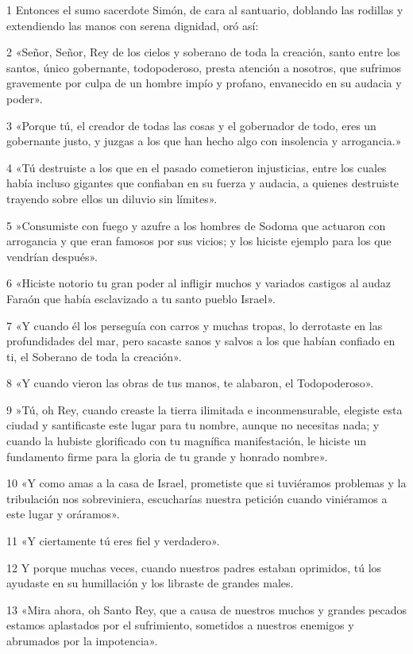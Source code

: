 \par 1 Entonces el sumo sacerdote Simón, de cara al santuario, doblando las rodillas y extendiendo las manos con serena dignidad, oró así:
\par 2 «Señor, Señor, Rey de los cielos y soberano de toda la creación, santo entre los santos, único gobernante, todopoderoso, presta atención a nosotros, que sufrimos gravemente por culpa de un hombre impío y profano, envanecido en su audacia y poder».
\par 3 «Porque tú, el creador de todas las cosas y el gobernador de todo, eres un gobernante justo, y juzgas a los que han hecho algo con insolencia y arrogancia.»
\par 4 «Tú destruiste a los que en el pasado cometieron injusticias, entre los cuales había incluso gigantes que confiaban en su fuerza y ​​audacia, a quienes destruiste trayendo sobre ellos un diluvio sin límites».
\par 5 »Consumiste con fuego y azufre a los hombres de Sodoma que actuaron con arrogancia y que eran famosos por sus vicios; y los hiciste ejemplo para los que vendrían después».
\par 6 «Hiciste notorio tu gran poder al infligir muchos y variados castigos al audaz Faraón que había esclavizado a tu santo pueblo Israel».
\par 7 «Y cuando él los perseguía con carros y muchas tropas, lo derrotaste en las profundidades del mar, pero sacaste sanos y salvos a los que habían confiado en ti, el Soberano de toda la creación».
\par 8 «Y cuando vieron las obras de tus manos, te alabaron, el Todopoderoso».
\par 9 »Tú, oh Rey, cuando creaste la tierra ilimitada e inconmensurable, elegiste esta ciudad y santificaste este lugar para tu nombre, aunque no necesitas nada; y cuando la hubiste glorificado con tu magnífica manifestación, le hiciste un fundamento firme para la gloria de tu grande y honrado nombre».
\par 10 «Y como amas a la casa de Israel, prometiste que si tuviéramos problemas y la tribulación nos sobreviniera, escucharías nuestra petición cuando viniéramos a este lugar y oráramos».
\par 11 «Y ciertamente tú eres fiel y verdadero».
\par 12 Y porque muchas veces, cuando nuestros padres estaban oprimidos, tú los ayudaste en su humillación y los libraste de grandes males.
\par 13 «Mira ahora, oh Santo Rey, que a causa de nuestros muchos y grandes pecados estamos aplastados por el sufrimiento, sometidos a nuestros enemigos y abrumados por la impotencia».
